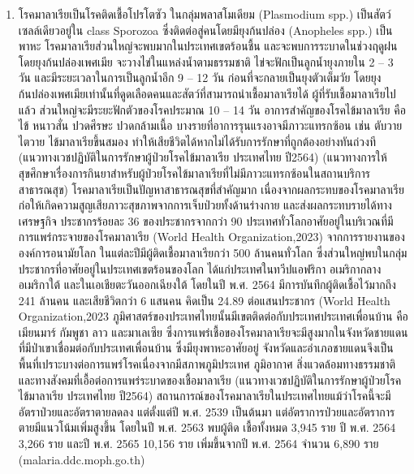 \begin{titlepage}
  \begin{enumerate}
    \item{โรคมาลาเรียเป็นโรคติดเชื้อโปรโตซัว ในกลุ่มพลาสโมเดียม (Plasmodium spp.) เป็นสัตว์เซลล์เดียวอยู่ใน class Sporozoa  ซึ่งติดต่อสู่คนโดยมียุงก้นปล่อง (Anopheles spp.) เป็นพาหะ โรคมาลาเรียส่วนใหญ่จะพบมากในประเทศเขตร้อนชื้น และจะพบการระบาดในช่วงฤดูฝน โดยยุงก้นปล่องเพศเมีย จะวางไข่ในแหล่งน้ำตามธรรมชาติ ไข่จะฟักเป็นลูกน้ำยุงภายใน 2 – 3 วัน และมีระยะเวลาในการเป็นลูกน้ำอีก 9 – 12 วัน ก่อนที่จะกลายเป็นยุงตัวเต็มวัย โดยยุงก้นปล่องเพศเมียเท่านั้นที่ดูดเลือดคนและสัตว์ที่สามารถนำเชื้อมาลาเรียได้ ผู้ที่รับเชื้อมาลาเรียไปแล้ว ส่วนใหญ่จะมีระยะฟักตัวของโรคประมาณ 10 – 14 วัน อาการสำคัญของโรคไข้มาลาเรีย คือ ไข้ หนาวสั่น ปวดศีรษะ ปวดกล้ามเนื้อ บางรายที่อาการรุนแรงอาจมีภาวะแทรกซ้อน เช่น ตับวาย ไตวาย ไข้มาลาเรียขึ้นสมอง ทำให้เสียชีวิตได้หากไม่ได้รับการรักษาที่ถูกต้องอย่างทันถ่วงที (แนวทางเวชปฏิบัติในการรักษาผู้ป่วยโรคไข้มาลาเรีย ประเทศไทย ปี2564) (แนวทางการให้สุขศึกษาเรื่องการกินยาสำหรับผู้ป่วยโรคไข้มาลาเรียที่ไม่มีภาวะแทรกซ้อนในสถานบริการสาธารณสุข) โรคมาลาเรียเป็นปัญหาสาธารณสุขที่สำคัญมาก เนื่องจากผลกระทบของโรคมาลาเรียก่อให้เกิดความสูญเสียภาวะสุขภาพจากการเจ็บป่วยทั้งด้านร่างกาย  และส่งผลกระทบรายได้ทางเศรษฐกิจ ประชากรร้อยละ 36 ของประชากรจากกว่า 90 ประเทศทั่วโลกอาศัยอยู่ในบริเวณที่มีการแพร่กระจายของโรคมาลาเรีย (World Health Organization,2023)
    จากการรายงานขององค์การอนามัยโลก ในแต่ละปีมีผู้ติดเชื้อมาลาเรียกว่า 500 ล้านคนทั่วโลก ซึ่งส่วนใหญ่พบในกลุ่มประชากรที่อาศัยอยู่ในประเทศเขตร้อนของโลก ได้แก่ประเทศในทวีปแอฟริกา อเมริกากลาง อเมริกาใต้ และในเอเชียตะวันออกเฉียงใต้ โดยในปี พ.ศ. 2564  มีการบันทึกผู้ติดเชื้อไว้มากถึง 241 ล้านคน และเสียชีวิตกว่า 6 แสนคน คิดเป็น 24.89 ต่อแสนประชากร (World Health Organization,2023
    ภูมิศาสตร์ของประเทศไทยนั้นมีเขตติดต่อกับประเทศประเทศเพื่อนบ้าน คือ เมียนมาร์ กัมพูชา ลาว และมาเลเซีย ซึ่งการแพร่เชื้อของโรคมาลาเรียจะมีสูงมากในจังหวัดชายแดนที่มีป่าเขาเชื่อมต่อกับประเทศเพื่อนบ้าน ซึ่งมียุงพาหะอาศัยอยู่ จังหวัดและอำเภอชายแดนจึงเป็นพื้นที่เปราะบางต่อการแพร่โรคเนื่องจากมีสภาพภูมิประเทศ ภูมิอากาศ สิ่งแวดล้อมทางธรรมชาติและทางสังคมที่เอื้อต่อการแพร่ระบาดของเชื้อมาลาเรีย  (แนวทางเวชปฏิบัติในการรักษาผู้ป่วยโรคไข้มาลาเรีย ประเทศไทย ปี2564) 
    สถานการณ์ของโรคมาลาเรียในประเทศไทยแม้ว่าโรคนี้จะมีอัตราป่วยและอัตราตายลดลง แต่ตั้งแต่ปี  พ.ศ. 2539 เป็นต้นมา แต่อัตราการป่วยและอัตราการตายมีแนวโน้มเพิ่มสูงขึ้น โดยในปี พ.ศ. 2563 พบผู้ติด เชื้อทั้งหมด 3,945 ราย ปี พ.ศ. 2564 3,266 ราย และปี พ.ศ. 2565 10,156 ราย  เพิ่มขึ้นจากปี พ.ศ. 2564 จำนวน 6,890 ราย (malaria.ddc.moph.go.th)
}
\end{enumerate}
\end{titlepage}
